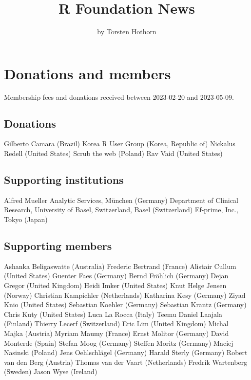\title{R Foundation News}


\author{by Torsten Hothorn}

\maketitle


\hypertarget{donations-and-members}{%
\section{Donations and members}\label{donations-and-members}}

Membership fees and donations received between
2023-02-20 and 2023-05-09.

\hypertarget{donations}{%
\subsection{Donations}\label{donations}}

Gilberto Camara (Brazil)
Korea R User Group (Korea, Republic of)
Nickalus Redell (United States)
Scrub the web (Poland)
Rav Vaid (United States)

\hypertarget{supporting-institutions}{%
\subsection{Supporting institutions}\label{supporting-institutions}}

Alfred Mueller Analytic Services, München (Germany)
Department of Clinical Research, University of Basel, Switzerland, Basel (Switzerland)
Ef-prime, Inc., Tokyo (Japan)

\hypertarget{supporting-members}{%
\subsection{Supporting members}\label{supporting-members}}

Ashanka Beligaswatte (Australia)
Frederic Bertrand (France)
Alistair Cullum (United States)
Guenter Faes (Germany)
Bernd Fröhlich (Germany)
Dejan Gregor (United Kingdom)
Heidi Imker (United States)
Knut Helge Jensen (Norway)
Christian Kampichler (Netherlands)
Katharina Kesy (Germany)
Ziyad Knio (United States)
Sebastian Koehler (Germany)
Sebastian Krantz (Germany)
Chris Kuty (United States)
Luca La Rocca (Italy)
Teemu Daniel Laajala (Finland)
Thierry Lecerf (Switzerland)
Eric Lim (United Kingdom)
Michal Majka (Austria)
Myriam Maumy (France)
Ernst Molitor (Germany)
David Monterde (Spain)
Stefan Moog (Germany)
Steffen Moritz (Germany)
Maciej Nasinski (Poland)
Jens Oehlschlägel (Germany)
Harald Sterly (Germany)
Robert van den Berg (Austria)
Thomas van der Vaart (Netherlands)
Fredrik Wartenberg (Sweden)
Jason Wyse (Ireland)


\address{%
Torsten Hothorn\\
Universität Zürich\\%
Switzerland\\
%
%
\textit{ORCiD: \href{https://orcid.org/0000-0001-8301-0471}{0000-0001-8301-0471}}\\%
\href{mailto:Torsten.Hothorn@R-project.org}{\nolinkurl{Torsten.Hothorn@R-project.org}}%
}
